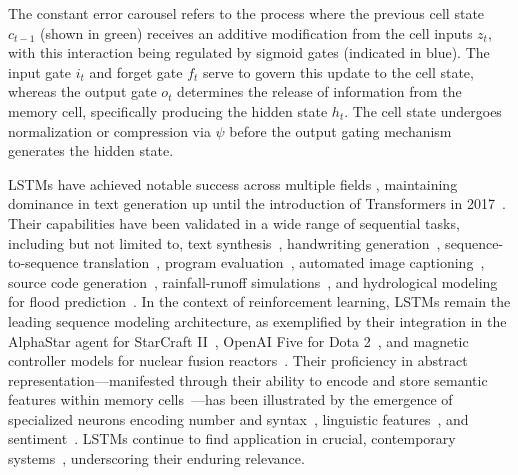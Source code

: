 The constant error carousel refers to the process where the previous cell state $c_{t-1}$ (shown in green) receives an additive modification from the cell inputs $z_t$, with this interaction being regulated by sigmoid gates (indicated in blue). The input gate $i_t$ and forget gate $f_t$ serve to govern this update to the cell state, whereas the output gate $o_t$ determines the release of information from the memory cell, specifically producing the hidden state $h_t$. The cell state undergoes normalization or compression via $\psi$ before the output gating mechanism generates the hidden state.

LSTMs have achieved notable success across multiple fields \citep{Hochreiter:01,Hochreiter:07,Schmidhuber:15}, maintaining dominance in text generation up until the introduction of Transformers in 2017~\citep{Vaswani:17}. Their capabilities have been validated in a wide range of sequential tasks, including but not limited to, text synthesis~\citep{Graves:13,Karpathy:15blog}, handwriting generation~\citep{Graves:13}, sequence-to-sequence translation~\citep{Sutskever:14nips}, program evaluation~\citep{Zaremba:14arxiv}, automated image captioning~\citep{Karpathy:15,Hossain:19}, source code generation~\citep{Karpathy:15blog}, rainfall-runoff simulations~\citep{Kratzert:18,Kratzert:19}, and hydrological modeling for flood prediction~\citep{Nearing:24}. In the context of reinforcement learning, LSTMs remain the leading sequence modeling architecture, as exemplified by their integration in the AlphaStar agent for StarCraft II~\citep{Vinyals:17short}, OpenAI Five for Dota 2~\citep{OpenAI:19}, and magnetic controller models for nuclear fusion reactors~\citep{Degrave:22short}. Their proficiency in abstract representation—manifested through their ability to encode and store semantic features within memory cells~\citep{Karpathy:15blog}—has been illustrated by the emergence of specialized neurons encoding number and syntax~\citep{Lakretz:19}, linguistic features~\citep{Bau:19}, and sentiment~\citep{Radford:17arxiv}. LSTMs continue to find application in crucial, contemporary systems~\citep{Degrave:22short,Nearing:24}, underscoring their enduring relevance.

